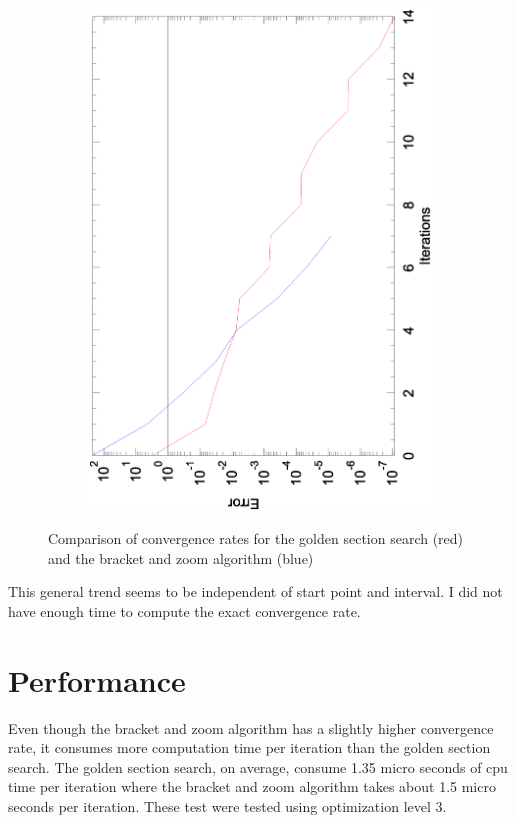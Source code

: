 \documentclass[12pt,parskip=full]{article}
\numberwithin{subsection}{section}
\begin{document}
\begin{figure}[h]
\begin{subfigure}[h]{0.45\textwidth}
				\includegraphics[width=\textwidth, angle=270]{Convergance_20_90.eps}
				\vspace{-13ex}
			\end{subfigure}
			\caption{Comparison of convergence rates for the golden section search (red) and the bracket and zoom algorithm (blue)\label{fig:convergence}}
		\end{figure}
		
		This general trend seems to be independent of start point and interval. I did not have enough time to compute the exact convergence rate.
	\section{Performance}
		
		Even though the bracket and zoom algorithm has a slightly higher convergence rate, it consumes more computation time per iteration than the golden
		section search. The golden section search, on average, consume 1.35 micro seconds of cpu time per iteration where the bracket and zoom 
		algorithm takes about 1.5 micro seconds per iteration. These test were tested using optimization level 3.
		
\end{document}
